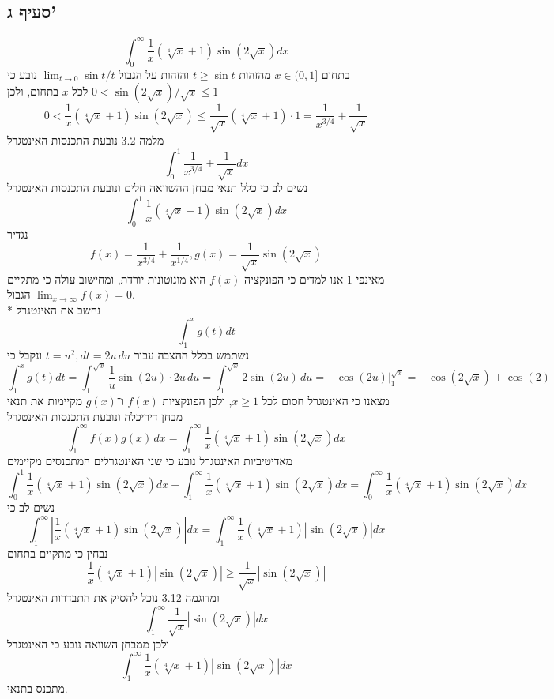 \subsection{סעיף ג'}
\[
	\int_0^\infty \frac{1}{x} (\sqrt[4]{x} + 1) \sin \left( 2 \sqrt{x} \right) dx
\]
בתחום $x \in (0, 1]$ מהזהות $t \ge \sin t$ והזהות על הגבול $\lim_{t \to 0} \sin t / t$ נובע כי $0 < \sin(2 \sqrt{x}) / \sqrt{x} \le 1$ לכל $x$ בתחום, %
ולכן
\[
	0 < 
	\frac{1}{x} (\sqrt[4]{x} + 1) \sin \left( 2 \sqrt{x} \right)
	\le \frac{1}{\sqrt{x}} (\sqrt[4]{x} + 1) \cdot 1
	= \frac{1}{x^{3/4}} + \frac{1}{\sqrt{x}}
\]
מלמה 3.2 נובעת התכנסות האינטגרל
\[
	\int_{0}^{1} \frac{1}{x^{3/4}} + \frac{1}{\sqrt{x}} dx
\]
נשים לב כי כלל תנאי מבחן ההשוואה חלים ונובעת התכנסות האינטגרל
\[
	\int_0^1 \frac{1}{x} (\sqrt[4]{x} + 1) \sin \left( 2 \sqrt{x} \right) dx
\]
נגדיר
\[
	f(x) = \frac{1}{x^{3/4}} + \frac{1}{x^{1/4}}, g(x) = \frac{1}{\sqrt{x}} \sin(2 \sqrt{x})
\]
מאינפי 1 אנו למדים כי הפונקציה $f(x)$ היא מונוטונית יורדת, ומחישוב עולה כי מתקיים הגבול $\lim_{x \to \infty} f(x) = 0$. \\*
נחשב את האינטגרל
\[
	\int_{1}^{x} g(t) dt
\]
נשתמש בכלל ההצבה עבור $t = u^2, dt = 2u \, du$ ונקבל כי
\[
	\int_{1}^{x} g(t) dt
	= \int_{1}^{\sqrt{x}} \frac{1}{u} \sin(2u) \cdot 2u \, du
	= \int_{1}^{\sqrt{x}} 2 \sin(2u) \, du
	= \left. -\cos(2u) \right|_1^{\sqrt{x}}
	= -\cos(2 \sqrt{x}) + \cos(2)
\]
מצאנו כי האינטגרל חסום לכל $x \ge 1$, ולכן הפונקציות $f(x)$ ו־$g(x)$ מקיימות את תנאי מבחן דיריכלה ונובעת התכנסות האינטגרל
\[
	\int_1^\infty f(x) g(x) \, dx
	= \int_1^\infty \frac{1}{x} (\sqrt[4]{x} + 1) \sin \left( 2 \sqrt{x} \right) dx
\]
מאדיטיביות האינטגרל נובע כי שני האינטגרלים המתכנסים מקיימים
\[
	\int_0^1 \frac{1}{x} (\sqrt[4]{x} + 1) \sin \left( 2 \sqrt{x} \right) dx
	+ \int_1^\infty \frac{1}{x} (\sqrt[4]{x} + 1) \sin \left( 2 \sqrt{x} \right) dx
	= \int_0^\infty \frac{1}{x} (\sqrt[4]{x} + 1) \sin \left( 2 \sqrt{x} \right) dx
\]
נשים לב כי
\[
	\int_1^\infty \left\lvert \frac{1}{x} (\sqrt[4]{x} + 1) \sin \left( 2 \sqrt{x} \right) \right\rvert dx
	= \int_1^\infty \frac{1}{x} (\sqrt[4]{x} + 1) \left\lvert \sin \left( 2 \sqrt{x} \right) \right\rvert dx
\]
נבחין כי מתקיים בתחום
\[
	\frac{1}{x} (\sqrt[4]{x} + 1) \left\lvert \sin \left( 2 \sqrt{x} \right) \right\rvert
	\ge \frac{1}{\sqrt{x}} \left\lvert \sin \left( 2 \sqrt{x} \right) \right\rvert
\]
ומדוגמה 3.12 נוכל להסיק את התבדרות האינטגרל
\[
	\int_{1}^{\infty} \frac{1}{\sqrt{x}} \left\lvert \sin \left( 2 \sqrt{x} \right) \right\rvert dx
\]
ולכן ממבחן השוואה נובע כי האינטגרל
\[
	\int_1^\infty \frac{1}{x} (\sqrt[4]{x} + 1) \left\lvert \sin \left( 2 \sqrt{x} \right) \right\rvert dx
\]
מתכנס בתנאי.


